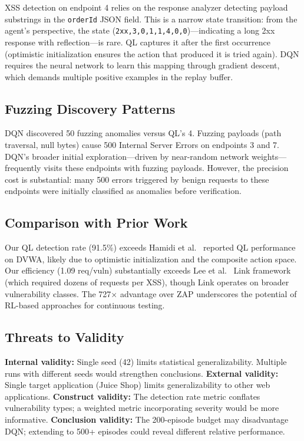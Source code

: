 \documentclass[5p,twocolumn]{elsarticle}
\begin{document}
XSS detection on endpoint 4 relies on the response analyzer detecting payload substrings in the \texttt{orderId} JSON field. This is a narrow state transition: from the agent's perspective, the state (\texttt{2xx,3,0,1,1,4,0,0})---indicating a long 2xx response with reflection---is rare. QL captures it after the first occurrence (optimistic initialization ensures the action that produced it is tried again). DQN requires the neural network to learn this mapping through gradient descent, which demands multiple positive examples in the replay buffer.

\subsection{Fuzzing Discovery Patterns}

DQN discovered 50 fuzzing anomalies versus QL's 4. Fuzzing payloads (path traversal, null bytes) cause 500 Internal Server Errors on endpoints 3 and 7. DQN's broader initial exploration---driven by near-random network weights---frequently visits these endpoints with fuzzing payloads. However, the precision cost is substantial: many 500 errors triggered by benign requests to these endpoints were initially classified as anomalies before verification.

\subsection{Comparison with Prior Work}

Our QL detection rate (91.5\%) exceeds Hamidi et al.~\cite{hamidi2023} reported QL performance on DVWA, likely due to optimistic initialization and the composite action space. Our efficiency (1.09 req/vuln) substantially exceeds Lee et al.~\cite{lee2022} Link framework (which required dozens of requests per XSS), though Link operates on broader vulnerability classes. The 727$\times$ advantage over ZAP underscores the potential of RL-based approaches for continuous testing.

\subsection{Threats to Validity}

\noindent\textbf{Internal validity:} Single seed (42) limits statistical generalizability. Multiple runs with different seeds would strengthen conclusions. \textbf{External validity:} Single target application (Juice Shop) limits generalizability to other web applications. \textbf{Construct validity:} The detection rate metric conflates vulnerability types; a weighted metric incorporating severity would be more informative. \textbf{Conclusion validity:} The 200-episode budget may disadvantage DQN; extending to 500+ episodes could reveal different relative performance.
\end{document}
